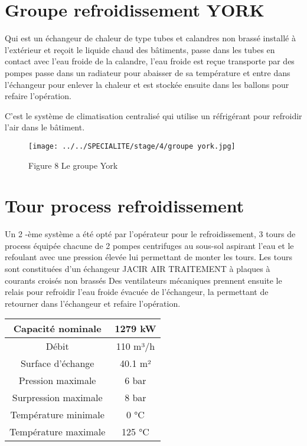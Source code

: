 \documentclass[20pt,a4paper]{report}
\begin{document}
\begin{large}
		\section{Groupe refroidissement YORK}
Qui est un échangeur de chaleur de type tubes et calandres non brassé installé à l’extérieur et reçoit le liquide chaud des bâtiments, passe dans les tubes en contact avec l’eau froide de la calandre, l’eau froide est reçue transporte par des pompes passe dans un radiateur pour abaisser de sa température et entre dans l’échangeur pour enlever la chaleur et est stockée ensuite dans les ballons pour refaire l’opération.

C’est le système de climatisation centralisé qui utilise un réfrigérant pour refroidir l’air dans le bâtiment.
 
\begin{figure}[h]
 \centering
 \texttt{[image: ../../SPECIALITE/stage/4/groupe york.jpg]}
 \caption{Figure 8 Le groupe York
 }
 \end{figure}
  
 
		\section{Tour process refroidissement}
Un 2 -ème système a été opté par l’opérateur pour le refroidissement, 3 tours de process équipée chacune de 2 pompes centrifuges au sous-sol aspirant l’eau et le refoulant avec une pression élevée lui permettant de monter les tours. Les tours sont constituées d’un échangeur JACIR AIR TRAITEMENT à plaques à courants croisés non brassés
Des ventilateurs mécaniques prennent ensuite le relais pour refroidir l’eau froide évacuée de l’échangeur, la permettant de retourner dans l’échangeur et refaire l’opération.\\

\begin{tabular}{|c|c|}
\hline 
Capacité nominale	& 1279 kW   \\ 
\hline 
Débit	& 110 m³/h \\ 
\hline 
Surface d’échange	& 40.1 m² \\ 
\hline 
Pression maximale	& 6 bar\\ 
\hline 
Surpression maximale &	8 bar \\ 
\hline 
Température minimale	& 0 °C\\ 
\hline 
 Température maximale	& 125 °C   \\ 
\hline 
\end{tabular} 





\end{large}
\end{document}
